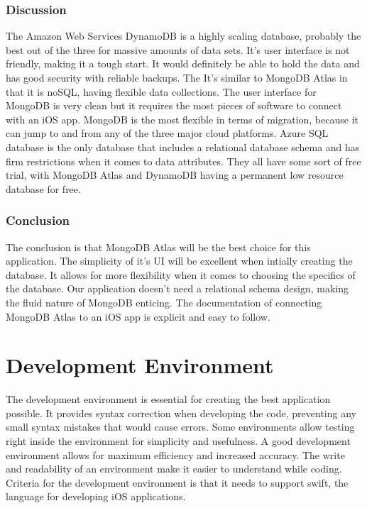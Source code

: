 \documentclass[letterpaper,10pt,draftclsnofoot,onecolumn,compsoc]{IEEEtran}
\begin{document}
\subsubsection{Discussion}
\begin{singlespace}
\noindent
The Amazon Web Services DynamoDB is a highly scaling database, probably the best out of the three for massive amounts of data sets. It's user interface is not friendly, making it a tough start. It would definitely be able to hold the data and has good security with reliable backups. The It's similar to MongoDB Atlas in that it is noSQL, having flexible data collections. The user interface for MongoDB is very clean but it requires the most pieces of software to connect with an iOS app. MongoDB is the most flexible in terms of migration, because it can jump to and from any of the three major cloud platforms. Azure SQL database is the only database that includes a relational database schema and has firm restrictions when it comes to data attributes. They all have some sort of free trial, with MongoDB Atlas and DynamoDB having a permanent low resource database for free.
\end{singlespace}

\subsubsection{Conclusion}
\begin{singlespace}
\noindent
The conclusion is that MongoDB Atlas will be the best choice for this application. The simplicity of it's UI will be excellent when intially creating the database. It allows for more flexibility when it comes to choosing the specifics of the database. Our application doesn't need a relational schema design, making the fluid nature of MongoDB enticing. The documentation of connecting MongoDB Atlas to an iOS app is explicit and easy to follow.
\end{singlespace}



\section{Development Environment}
\begin{singlespace}

The development environment is essential for creating the best application possible. It provides syntax correction when developing the code, preventing any small syntax mistakes that would cause errors. Some environments allow testing right inside the environment for simplicity and usefulness. A good development environment allows for maximum efficiency and increased accuracy. The write and readability of an environment make it easier to understand while coding.\\

Criteria for the development environment is that it needs to support swift, the language for developing iOS applications. 
\end{singlespace}
\end{document}
